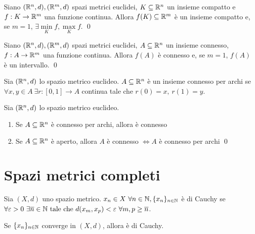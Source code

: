 \begin{theorem}
    [di Weierstrass]
    Siano $(\mathbb{R}^n, d), (\mathbb{R}^m, d)$ spazi metrici euclidei, $K \subseteq \mathbb{R}^n$ un insieme compatto e $f: K \to \mathbb{R}^m$ una funzione continua. Allora $f(K) \subseteq \mathbb{R}^m$ è un insieme compatto e, se $m=1$, $\exists \min\limits_Kf, \max\limits_Kf$.
    \qed
\end{theorem}

\begin{theorem}
    [di Bolzano]
    Siano $(\mathbb{R}^n, d), (\mathbb{R}^m, d)$ spazi metrici euclidei, $A \subseteq \mathbb{R}^n$ un insieme connesso, $f: A \to \mathbb{R}^m$ una funzione continua. Allora $f(A)$ è connesso e, se $m=1$, $f(A)$ è un intervallo.
    \qed
\end{theorem}

\begin{definition}
    Sia $(\mathbb{R}^n, d)$ lo spazio metrico euclideo. $A \subseteq \mathbb{R}^n$ è un insieme connesso per archi se $\forall x, y \in A \ \exists r: [0,1] \to A$ continua tale che $r(0)=x,\ r(1)=y$.
\end{definition}

\begin{theorem}
    Sia $(\mathbb{R}^n, d)$ lo spazio metrico euclideo.
    \begin{enumerate}
        \item Se $A \subseteq \mathbb{R}^n$ è connesso per archi, allora è connesso
        \item Se $A \subseteq \mathbb{R}^n$ è aperto, allora $A$ è connesso $\iff A$ è connesso per archi
        \qed
    \end{enumerate}
\end{theorem}

\section{Spazi metrici completi}

\begin{definition}
    Sia $(X, d)$ uno spazio metrico. $x_n \in X \ \forall n \in \mathbb{N}, \{x_n\}_{n \in \mathbb{N}}$ è di Cauchy se $\forall \varepsilon > 0 \ \exists \overline{n} \in \mathbb{N} \text{ tale che } d(x_m, x_p) < \varepsilon \ \forall m, p \geq \overline{n}$.
\end{definition}

\begin{theorem}
    Se $\{x_n\}_{n \in \mathbb{N}}$ converge in $(X, d)$, allora è di Cauchy.
\end{theorem}


